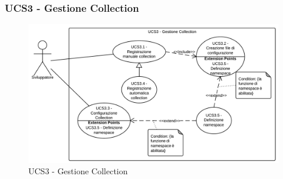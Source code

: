 \subsubsection{UCS3 - Gestione Collection} 
    \begin{figure}[H]
      \begin{center}
      \includegraphics[scale=0.16]{UML/UCS3 - Gestione Collection.png}
      \caption{UCS3 - Gestione Collection}
      \end{center} 
    \end{figure}  
    
